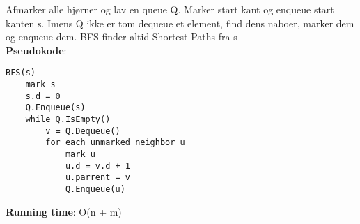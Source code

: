 Afmarker alle hjørner og lav en queue Q. Marker start kant og enqueue start kanten s. Imens Q ikke er tom dequeue et element, find dens naboer, marker dem og enqueue dem. BFS finder altid Shortest Paths fra s\\
\textbf{Pseudokode}:
\begin{lstlisting}[frame=single, mathescape=true]
BFS(s)
	mark s
	s.d = 0
	Q.Enqueue(s)
	while Q.IsEmpty()
		v = Q.Dequeue()
		for each unmarked neighbor u
			mark u
			u.d = v.d + 1
			u.parrent = v
			Q.Enqueue(u)
\end{lstlisting}
\textbf{Running time}: O(n + m)
